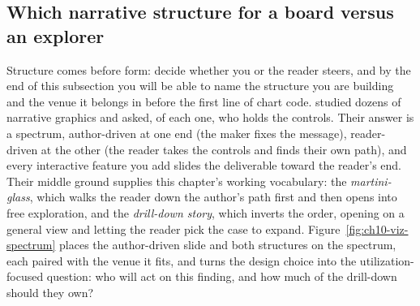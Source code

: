 \documentclass[
    a4paper,
    fontsize=10pt,
    twoside=true,
    numbers=noenddot,
]{kaobook}
\begin{document}
\subsection{Which narrative structure for a board versus an explorer}\label{ch10-sec:structures}
Structure comes before form: decide whether you or the reader steers, and by the end of this subsection you will be able to name the structure you are building and the venue it belongs in before the first line of chart code. \textcite{segel2010narrative} studied dozens of narrative graphics and asked, of each one, who holds the controls. Their answer is a spectrum, author-driven at one end (the maker fixes the message), reader-driven at the other (the reader takes the controls and finds their own path), and every interactive feature you add slides the deliverable toward the reader's end. Their middle ground supplies this chapter's working vocabulary: the \emph{martini-glass}, which walks the reader down the author's path first and then opens into free exploration, and the \emph{drill-down story}, which inverts the order, opening on a general view and letting the reader pick the case to expand. Figure~\ref{fig:ch10-viz-spectrum} places the author-driven slide and both structures on the spectrum, each paired with the venue it fits, and turns the design choice into the utilization-focused question: who will act on this finding, and how much of the drill-down should they own?
\end{document}
